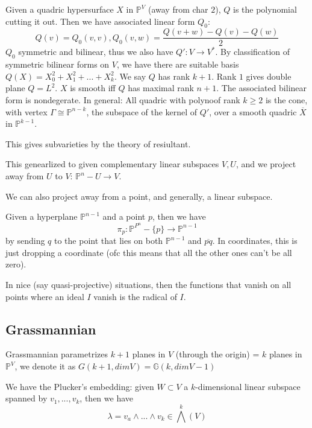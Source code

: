 \documentclass[main.tex]{subfiles}
\newcommand{\Pn}[1]{\mathbb{P}^{#1}}
\begin{document}
\begin{example}[Quadratics]
Given a quadric hypersurface $X$ in $\Pn{V}$ (away from char $2$), $Q$ is the polynomial cutting it out. Then we have associated linear form $Q_0$:
$$
Q(v) = Q_0(v, v), Q_0(v, w) = \frac{Q(v+w) - Q(v) - Q(w)}{2}
$$
$Q_0$ symmetric and bilinear, thus we also have $Q': V \rightarrow V^*$. By classification of symmetric bilinear forms on $V$, we have there are suitable basis $Q(X) = X_0^2 + X_1^2 + ... + X_k ^2$.  We say $Q$ has rank $k+1$. Rank $1$ gives double plane $Q = L^2$. $X$ is smooth iff $Q$ has maximal rank $n+1$. The associated bilinear form is nondegerate. In general:
All quadric with polynoof rank $k \geq 2$ is the cone, with vertex $\Gamma \cong \Pn{n-k}$, the subspace of the kernel of $Q'$, over a smooth quadric $\overline{X}$ in $\Pn{k-1}$.

This gives subvarieties by the theory of resiultant.

This genearlized to given complementary linear subspaces $V, U$, and we project away from $U$ to $V$: $\Pn{n} - U \rightarrow V$.
\end{example}

\begin{examle}[Projections]
We can also project away from a point, and generally, a linear subspace.

Given a hyperplane $\Pn{n-1}$ and a point $p$, then we have 
$$
\pi_p: \Pn{P}^n - \{p\} \rightarrow \Pn{n-1}
$$
by sending $q$ to the point that lies on both $\Pn{n-1}$ and $\overline{pq}$. In coordinates, this is just dropping a coordinate (ofc this means that all the other ones can't be all zero).
\end{examle}




\begin{theorem}
In nice (say quasi-projective) situations, then the functions that vanish on all points where an ideal $I$ vanish is the radical of $I$. 
\end{theorem}

\subsection{Grassmannian}
Grassmannian parametrizes $k + 1$ planes in $V$ (through the origin) = $k$ planes in $\Pn{V}$, we denote it as $G(k+1, dim V) = \mathbb{G}(k, dim V -1)$

We have the Plucker's embedding: given $W \subset V$ a $k$-dimensional linear subspace spanned by $v_1, ..., v_k$, then we have
$$
\lambda = v_a \wedge ... \wedge v_k \in \bigwedge^k (V)
$$
\end{document}
